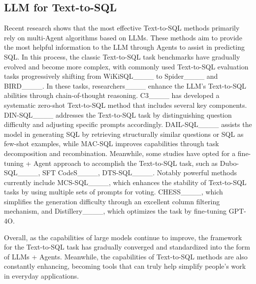 \subsection{LLM for Text-to-SQL}
Recent research shows that the most effective Text-to-SQL methods primarily rely on multi-Agent algorithms based on LLMs. These methods aim to provide the most helpful information to the LLM through Agents to assist in predicting SQL. In this process, the classic Text-to-SQL task benchmarks have gradually evolved and become more complex, with commonly used Text-to-SQL evaluation tasks progressively shifting from WiKiSQL____ to Spider____ and BIRD____.
In these tasks, researchers____ enhance the LLM's Text-to-SQL abilities through chain-of-thought reasoning. C3____ has developed a systematic zero-shot Text-to-SQL method that includes several key components. DIN-SQL____ addresses the Text-to-SQL task by distinguishing question difficulty and adjusting specific prompts accordingly. DAIL-SQL____ assists the model in generating SQL by retrieving structurally similar questions or SQL as few-shot examples, while MAC-SQL improves capabilities through task decomposition and recombination. Meanwhile, some studies have opted for a fine-tuning + Agent approach to accomplish the Text-to-SQL task, such as Dubo-SQL____, SFT CodeS____, DTS-SQL____. Notably powerful methods currently include MCS-SQL____, which enhances the stability of Text-to-SQL tasks by using multiple sets of prompts for voting. CHESS____, which simplifies the generation difficulty through an excellent column filtering mechanism, and Distillery____, which optimizes the task by fine-tuning GPT-4O.


Overall, as the capabilities of large models continue to improve, the framework for the Text-to-SQL task has gradually converged and standardized into the form of LLMs + Agents. Meanwhile, the capabilities of Text-to-SQL methods are also constantly enhancing, becoming tools that can truly help simplify people's work in everyday applications.